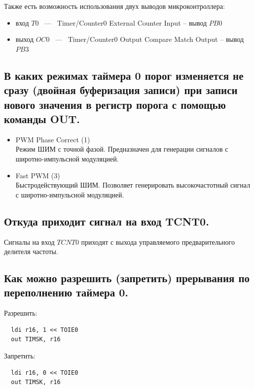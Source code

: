 Также есть возможность использования двух выводов микроконтроллера:
\begin{itemize}
  \item вход $T0$ ~---~ Timer/Counter0 External Counter Input -- вывод $PB0$
  \item выход $OC0$ ~---~ Timer/Counter0 Output Compare Match Output -- вывод $PB3$
\end{itemize}

\subsection{В каких режимах таймера 0 порог изменяется не сразу (двойная буферизация записи) при записи нового значения в регистр порога с помощью команды OUT. }
\begin{itemize}
  \item PWM Phase Correct (1)\\
Режим ШИМ с точной фазой. Предназначен для генерации сигналов с
широтно-импульсной модуляцией.
  \item Fast PWM (3) \\
Быстродействующий ШИМ. Позволяет генерировать высокочастотный сигнал
с широтно-импульсной модуляцией.
\end{itemize}

\subsection{Откуда приходит сигнал на вход TCNT0.}
Сигналы на вход $TCNT0$ приходят с выхода управляемого предварительного 
делителя частоты.


\subsection{Как можно разрешить (запретить) прерывания по переполнению таймера 0.}
Разрешить:
\begin{verbatim}
  ldi r16, 1 << TOIE0
  out TIMSK, r16
\end{verbatim}

Запретить:
\begin{verbatim}
  ldi r16, 0 << TOIE0
  out TIMSK, r16
\end{verbatim}

